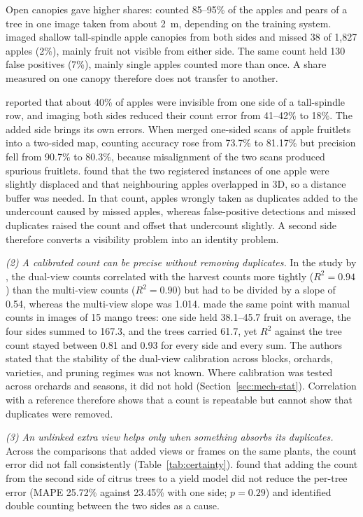 Open canopies gave higher shares: \citet{bresilla2019single} counted 85--95\% of the apples and pears of a tree in one image taken from about 2~m, depending on the training system. \citet{silwal2016hierarchical} imaged shallow tall-spindle apple canopies from both sides and missed 38 of 1{,}827 apples (2\%), mainly fruit not visible from either side. The same count held 130 false positives (7\%), mainly single apples counted more than once. A share measured on one canopy therefore does not transfer to another.

\citet{gongal2016apple} reported that about 40\% of apples were invisible from one side of a tall-spindle row, and imaging both sides reduced their count error from 41--42\% to 18\%. The added side brings its own errors. When \citet{qureshi2023seeing} merged one-sided scans of apple fruitlets into a two-sided map, counting accuracy rose from 73.7\% to 81.17\% but precision fell from 90.7\% to 80.3\%, because misalignment of the two scans produced spurious fruitlets. \citet{gongal2016apple} found that the two registered instances of one apple were slightly displaced and that neighbouring apples overlapped in 3D, so a distance buffer was needed. In that count, apples wrongly taken as duplicates added to the undercount caused by missed apples, whereas false-positive detections and missed duplicates raised the count and offset that undercount slightly. A second side therefore converts a visibility problem into an identity problem.

\textit{(2) A calibrated count can be precise without removing duplicates.} In the study by \citet{stein2016image}, the dual-view counts correlated with the harvest counts more tightly ($R^2=0.94$) than the multi-view counts ($R^2=0.90$) but had to be divided by a slope of 0.54, whereas the multi-view slope was 1.014. \citet{payne2013estimation} made the same point with manual counts in images of 15 mango trees: one side held 38.1--45.7 fruit on average, the four sides summed to 167.3, and the trees carried 61.7, yet $R^2$ against the tree count stayed between 0.81 and 0.93 for every side and every sum. The authors stated that the stability of the dual-view calibration across blocks, orchards, varieties, and pruning regimes was not known. Where calibration was tested across orchards and seasons, it did not hold (Section~\ref{sec:mech-stat}). Correlation with a reference therefore shows that a count is repeatable but cannot show that duplicates were removed.

\textit{(3) An unlinked extra view helps only when something absorbs its duplicates.} Across the comparisons that added views or frames on the same plants, the count error did not fall consistently (Table~\ref{tab:certainty}). \citet{vijayakumar2023tree} found that adding the count from the second side of citrus trees to a yield model did not reduce the per-tree error (MAPE 25.72\% against 23.45\% with one side; $p=0.29$) and identified double counting between the two sides as a cause.

